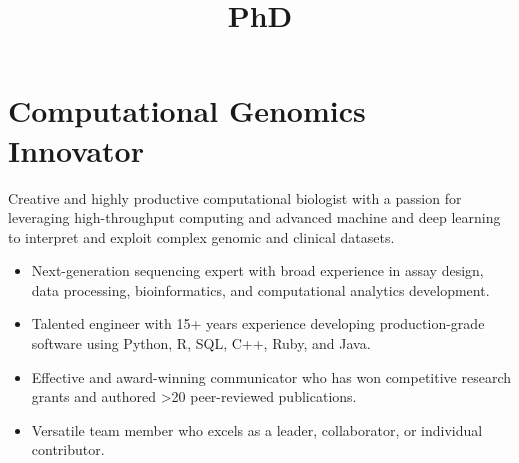 \documentclass[11pt,letter,sans]{moderncv}
\title{PhD}
\newenvironment{mypar}
    {\setlength{\parskip}{0.5em}}
    {}
\begin{document}
\makecvtitle
    
\section{Computational Genomics Innovator}


\begin{mypar}
Creative and highly productive computational biologist with a passion for leveraging high-throughput computing and advanced machine and deep learning to interpret and exploit complex genomic and clinical datasets.
\end{mypar}

\begin{itemize}
\item {Next-generation sequencing expert with broad experience in assay design, data processing, bioinformatics, and computational analytics development.}
\item {Talented engineer with 15+ years experience developing production-grade software using Python, R, SQL, C++, Ruby, and Java.}
\item {Effective and award-winning communicator who has won competitive research grants and authored >20 peer-reviewed publications.}
\item {Versatile team member who excels as a leader, collaborator, or individual contributor.}
\end{itemize}
\end{document}
